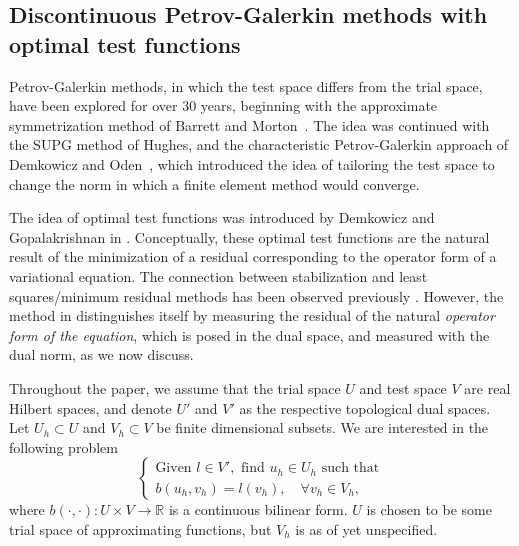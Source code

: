 \documentclass[11pt,onecolumn]{scrartcl}
\newcommand{\eqnlab}[1]{\label{eq:#1}}
\newcommand{\seclab}[1]{\label{sec:#1}}
\newcommand{\mbb}[1]{\mathbb{#1}}
\newcommand{\LRp}[1]{\left( #1 \right)}
\begin{document}

\subsection{Discontinuous Petrov-Galerkin methods with optimal test functions}
\seclab{optimalTest} Petrov-Galerkin methods, in which the test space
differs from the trial space, have been explored for over 30 years,
beginning with the approximate symmetrization method of Barrett and
Morton~\cite{BARRETT01101981}. The idea was continued with the SUPG
method of Hughes, and the characteristic Petrov-Galerkin approach of
Demkowicz and Oden~\cite{Demkowicz1986188}, which introduced the
idea of tailoring the test space to change the norm in which a finite
element method would converge.

The idea of optimal test functions was introduced by Demkowicz and
Gopalakrishnan in \cite{DPG2}.  Conceptually, these optimal test
functions are the natural result of the minimization of a residual
corresponding to the operator form of a variational equation. The
connection between stabilization and least squares/minimum residual
methods has been observed previously \cite{GLS}. However, the method in \cite{DPG2} distinguishes itself
by measuring the residual of the natural \textit{operator form of the equation}, which is posed in the dual space, and measured with the dual norm, as we now discuss. 	

Throughout the paper, we assume that the trial space $U$ and test space $V$ are real Hilbert spaces, and denote $U'$ and $V'$ as the respective topological dual spaces. Let $U_h \subset U$ and $V_h\subset V$ be finite dimensional subsets. We are interested in the following problem  
\begin{equation}
\eqnlab{variationEq}
\left\{
  \begin{array}{l}
    \text{Given } l \in V', \text{ find } u_h \in U_h  \text{ such that} \\ 
    b(u_h,v_h) = l(v_h), \quad \forall v_h\in V_h,
  \end{array}
  \right.
\end{equation}
where $b\LRp{\cdot,\cdot}: U \times V \to \mbb{R}$ is a continuous
bilinear form.  $U$ is chosen to be some trial space of approximating functions, but $V_h$ is as of yet unspecified. 
\end{document}
